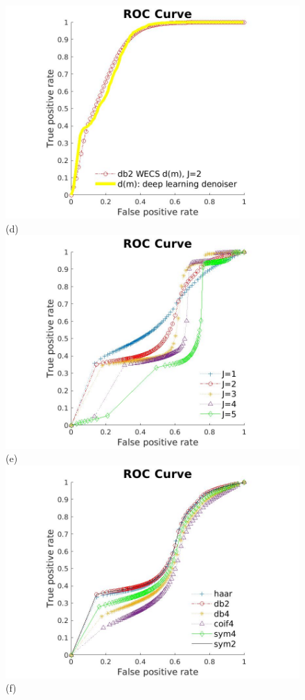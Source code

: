 \documentclass[journal]{IEEEtran}
\begin{document}
\begin{figure}[htp!]
\includegraphics[scale=.13]{../../figs/dm_comparison_wavelet_deepL}\hspace{-.5cm}(d) \\
\includegraphics[scale=.13]{../../figs/levels_comparison_NoReference}\hspace{-.5cm}(e)
\includegraphics[scale=.13]{../../figs/families_comparison_NoReference}\hspace{-.5cm}(f)

\end{figure}
\end{document}
